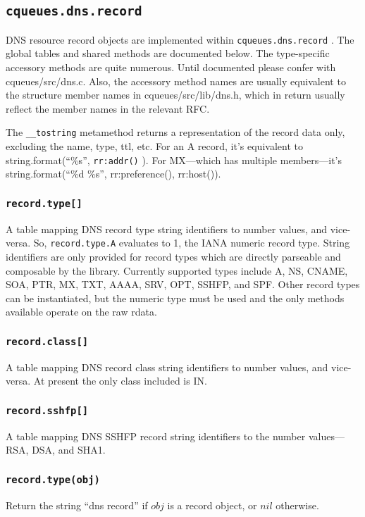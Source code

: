 \documentclass[11pt, oneside]{memoir}
\newcommand{\routine}[1]{\texttt{#1} }
\newcommand{\fn}[1]{\texttt{#1} }
\newcommand{\method}[1]{\texttt{#1} }
\newcommand{\module}[1]{\texttt{#1} }
\newcounter{toccols}
\newenvironment{Module}[1]{
	\subsection{\texttt{#1}}
	\addtocontents{toc}{
		\protect\begin{multicols}{\value{toccols}}
	}
}{
	\addtocontents{toc}{\protect\end{multicols}}
}
\begin{document}
\begin{Module}{cqueues.dns.record}

DNS resource record objects are implemented within \module{cqueues.dns.record}. The global tables and shared methods are documented below. The type-specific accessory methods are quite numerous. Until documented please confer with cqueues/src/dns.c. Also, the accessory method names are usually equivalent to the structure member names in cqueues/src/lib/dns.h, which in return usually reflect the member names in the relevant RFC.

The \fn{\_\_tostring} metamethod returns a representation of the record data only, excluding the name, type, ttl, etc. For an A record, it's equivalent to string.format(``\%s'', \fn{rr:addr()}). For MX---which has multiple members---it's string.format(``\%d \%s'', rr:preference(), rr:host()).

\subsubsection[\fn{record.type[]}]{\fn{record.type[]}}

A table mapping DNS record type string identifiers to number values, and vice-versa. So, \method{record.type.A} evaluates to 1, the IANA numeric record type. String identifiers are only provided for record types which are directly parseable and composable by the library. Currently supported types include A, NS, CNAME, SOA, PTR, MX, TXT, AAAA, SRV, OPT, SSHFP, and SPF. Other record types can be instantiated, but the numeric type must be used and the only methods available operate on the raw rdata.

\subsubsection[\fn{record.class[]}]{\fn{record.class[]}}

A table mapping DNS record class string identifiers to number values, and vice-versa. At present the only class included is IN.

\subsubsection[\fn{record.sshfp[]}]{\fn{record.sshfp[]}}

A table mapping DNS SSHFP record string identifiers to the number values---RSA, DSA, and SHA1.

\subsubsection[\routine{record.type}]{\routine{record.type(obj)}}
Return the string ``dns record'' if $obj$ is a record object, or $nil$ otherwise.


\end{Module}
\end{document}

